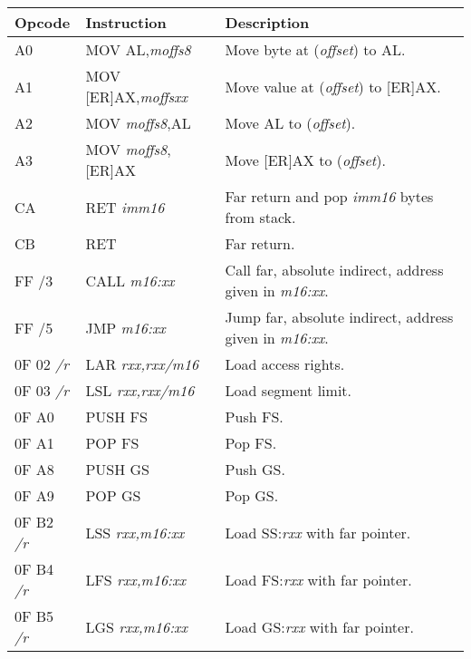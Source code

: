 \bigskip
\noindent
\begin{tabularx}{\textwidth}{| l | l | Z |} \hline
  \textbf{Opcode} & \textbf{Instruction} &
  \textbf{Description}\\
  \hline
  A0 & MOV AL,\emph{moffs8} & Move byte at (\emph{offset}) to AL.\\
  \hline
  A1 & MOV [ER]AX,\emph{moffsxx} & Move value at (\emph{offset}) to [ER]AX.\\
  \hline
  A2 & MOV \emph{moffs8},AL & Move AL to  (\emph{offset}).\\
  \hline
  A3 & MOV \emph{moffs8},[ER]AX & Move [ER]AX to  (\emph{offset}).\\
  \hline
  CA & RET \emph{imm16} &
  Far return and pop \emph{imm16} bytes from stack.\\
  \hline
  CB & RET & Far return.\\
  \hline
  FF /3 & CALL \emph{m16:xx} &
  Call far, absolute indirect, address given in \emph{m16:xx}.\\
  \hline
  FF /5 & JMP \emph{m16:xx} &
  Jump far, absolute indirect, address given in \emph{m16:xx}.\\
  \hline
  0F 02 \emph{/r} & LAR \emph{rxx,rxx/m16} &
  Load access rights.\\
  \hline
  0F 03 \emph{/r} & LSL \emph{rxx,rxx/m16} &
  Load segment limit.\\
  \hline
  0F A0 & PUSH FS & Push FS.\\
  \hline
  0F A1 & POP FS & Pop FS.\\
  \hline
  0F A8 & PUSH GS & Push GS.\\
  \hline
  0F A9 & POP GS & Pop GS.\\
  \hline
  0F B2 \emph{/r} & LSS \emph{rxx,m16:xx} &
  Load SS:\emph{rxx} with far pointer.\\
  \hline
  0F B4 \emph{/r} & LFS \emph{rxx,m16:xx} &
  Load FS:\emph{rxx} with far pointer.\\
  \hline
  0F B5 \emph{/r} & LGS \emph{rxx,m16:xx} &
  Load GS:\emph{rxx} with far pointer.\\
  \hline
\end{tabularx}
